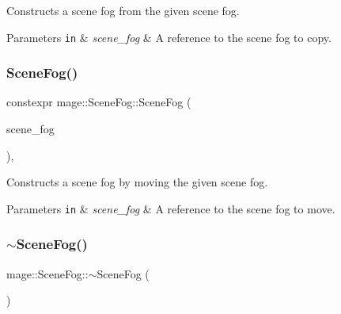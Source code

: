 Constructs a scene fog from the given scene fog.


\begin{DoxyParams}[1]{Parameters}
\mbox{\tt in}  & {\em scene\+\_\+fog} & A reference to the scene fog to copy. \\
\hline
\end{DoxyParams}
\hypertarget{classmage_1_1_scene_fog_a85281feff6fff05548d29f272f54fe4d}{}\label{classmage_1_1_scene_fog_a85281feff6fff05548d29f272f54fe4d} 
\subsubsection{\texorpdfstring{Scene\+Fog()}{SceneFog()}\hspace{0.1cm}{\footnotesize\ttfamily [3/3]}}
{\footnotesize\ttfamily constexpr mage\+::\+Scene\+Fog\+::\+Scene\+Fog (\begin{DoxyParamCaption}\item[{\hyperlink{classmage_1_1_scene_fog}{Scene\+Fog} \&\&}]{scene\+\_\+fog }\end{DoxyParamCaption})\hspace{0.3cm}{\ttfamily [default]}, {\ttfamily [noexcept]}}

Constructs a scene fog by moving the given scene fog.


\begin{DoxyParams}[1]{Parameters}
\mbox{\tt in}  & {\em scene\+\_\+fog} & A reference to the scene fog to move. \\
\hline
\end{DoxyParams}
\hypertarget{classmage_1_1_scene_fog_afb25181d31f74e4981c226019fee0669}{}\label{classmage_1_1_scene_fog_afb25181d31f74e4981c226019fee0669} 
\subsubsection{\texorpdfstring{$\sim$\+Scene\+Fog()}{~SceneFog()}}
{\footnotesize\ttfamily mage\+::\+Scene\+Fog\+::$\sim$\+Scene\+Fog (\begin{DoxyParamCaption}{ }\end{DoxyParamCaption})\hspace{0.3cm}{\ttfamily [default]}}


